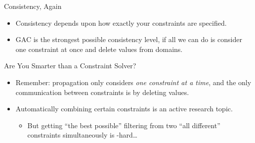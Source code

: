 \documentclass[aspectratio=169,compress,10pt]{beamer}
\begin{document}
\begin{frame}{Consistency, Again}
    \begin{itemize}
        \item Consistency depends upon how exactly your constraints are specified.
        \item GAC is the strongest possible consistency level, if all we can do is consider one
            constraint at once and delete values from domains.
    \end{itemize}
\end{frame}

\begin{frame}{Are You Smarter than a Constraint Solver?}
     {
        \begin{center}\end{center}
    }

     {
        \begin{itemize}
            \item Remember: propagation only considers \emph{one constraint at a time}, and the only
                communication between constraints is by deleting values.

            \item Automatically combining certain constraints is an active research topic.
                \begin{itemize}
                    \item But getting ``the best possible'' filtering from two ``all different''
                        constraints simultaneously is \NP-hard\ldots
                \end{itemize}
        \end{itemize}
    }
\end{frame}
\end{document}

